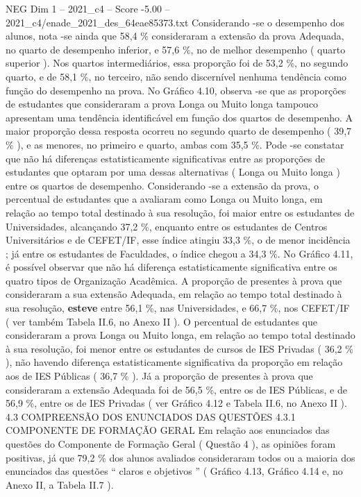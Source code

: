 \begin{textsample}{NEG Dim 1 – 2021\_c4 – Score -5.00 – 2021\_c4/enade\_2021\_des\_64eae85373.txt}
Considerando -se o desempenho dos alunos, nota -se ainda que 58,4 \% consideraram a extensão da prova Adequada, no quarto de desempenho inferior, e 57,6 \%, no de melhor desempenho ( quarto superior ).
Nos quartos intermediários, essa proporção foi de 53,2 \%, no segundo quarto, e de 58,1 \%, no terceiro, não sendo discernível nenhuma tendência como função do desempenho na prova.
No Gráfico 4.10, observa -se que as proporções de estudantes que consideraram a prova Longa ou Muito longa tampouco apresentam uma tendência identificável em função dos quartos de desempenho.
A maior proporção dessa resposta ocorreu no segundo quarto de desempenho ( 39,7 \% ), e as menores, no primeiro e quarto, ambas com 35,5 \%.
Pode -se constatar que não há diferenças estatisticamente significativas entre as proporções de estudantes que optaram por uma dessas alternativas ( Longa ou Muito longa ) entre os quartos de desempenho.
Considerando -se a extensão da prova, o percentual de estudantes que a avaliaram como Longa ou Muito longa, em relação ao tempo total destinado à sua resolução, foi maior entre os estudantes de Universidades, alcançando 37,2 \%, enquanto entre os estudantes de Centros Universitários e de CEFET/IF, esse índice atingiu 33,3 \%, o de menor incidência ; já entre os estudantes de Faculdades, o índice chegou a 34,3 \%.
No Gráfico 4.11, é possível observar que não há diferença estatisticamente significativa entre os quatro tipos de Organização Acadêmica.
A proporção de presentes à prova que consideraram a sua extensão Adequada, em relação ao tempo total destinado à sua resolução, \textbf{esteve} entre 56,1 \%, nas Universidades, e 66,7 \%, nos CEFET/IF ( ver também Tabela II.6, no Anexo II ).
O percentual de estudantes que consideraram a prova Longa ou Muito longa, em relação ao tempo total destinado à sua resolução, foi menor entre os estudantes de cursos de IES Privadas ( 36,2 \% ), não havendo diferença estatisticamente significativa da proporção em relação aos de IES Públicas ( 36,7 \% ).
Já a proporção de presentes à prova que consideraram a extensão Adequada foi de 56,5 \%, entre os de IES Públicas, e de 56,9 \%, entre os de IES Privadas ( ver Gráfico 4.12 e Tabela II.6, no Anexo II ). 4.3 COMPREENSÃO DOS ENUNCIADOS DAS QUESTÕES 4.3.1 COMPONENTE DE FORMAÇÃO GERAL Em relação aos enunciados das questões do Componente de Formação Geral ( Questão 4 ), as opiniões foram positivas, já que 79,2 \% dos alunos avaliados consideraram todos ou a maioria dos enunciados das questões “ claros e objetivos ” ( Gráfico 4.13, Gráfico 4.14 e, no Anexo II, a Tabela II.7 ).

\end{textsample}
